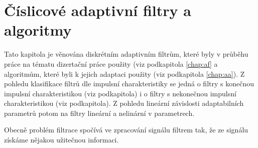 \chapter{Číslicové adaptivní filtry a algoritmy}
Tato kapitola je věnována diskrétním adaptivním filtrům, které byly v průběhu práce na tématu dizertační práce použity (viz podkapitola \ref{chap:af} a algoritmům, které byli k jejich adaptaci použity (viz podkapitola \ref{chap:aa}). Z pohledu klasifikace filtrů dle impulsní charakteristiky se jedná o filtry s konečnou impulsní charakteristikou (viz podkapitola) i o filtry s nekonečnou impulsní charakteristikou (viz podkapitola). Z pohledu lineární závislosti adaptabilních parametrů potom na filtry lineární a nelinární v parametrech.
\par 
Obecně problém filtrace spočívá ve zpracování signálu filtrem tak, že ze signálu získáme nějakou užitečnou informaci\cite{haykin}.

